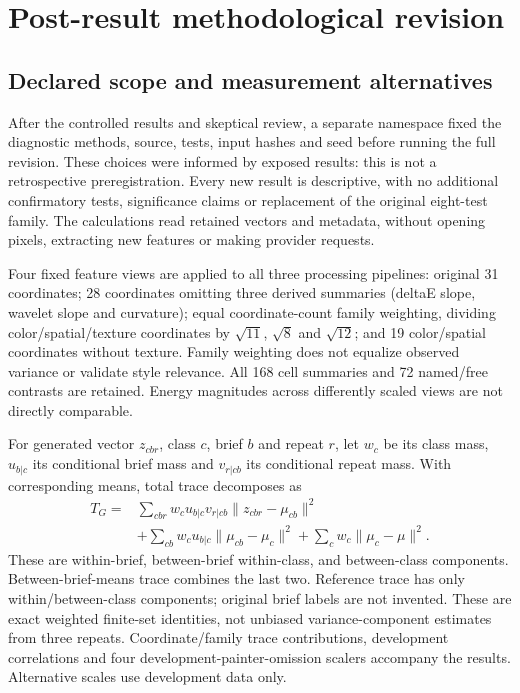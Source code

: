 \section{Post-result methodological revision}
\subsection{Declared scope and measurement alternatives}
After the controlled results and skeptical review, a separate namespace fixed
the diagnostic methods, source, tests, input hashes and seed before running the
full revision. These choices were informed by exposed results: this is not a
retrospective preregistration. Every new result is descriptive, with no additional
confirmatory tests, significance claims or replacement of the original eight-test
family. The calculations read retained vectors and metadata, without opening
pixels, extracting new features or making provider requests.

Four fixed feature views are applied to all three processing pipelines: original
31 coordinates; 28 coordinates omitting three derived summaries (deltaE slope,
wavelet slope and curvature); equal coordinate-count family weighting, dividing
color/spatial/texture coordinates by $\sqrt{11}$, $\sqrt{8}$ and $\sqrt{12}$;
and 19 color/spatial coordinates without texture. Family weighting does not
equalize observed variance or validate style relevance. All 168 cell summaries
and 72 named/free contrasts are retained. Energy magnitudes across differently
scaled views are not directly comparable.

For generated vector $z_{cbr}$, class $c$, brief $b$ and repeat $r$, let $w_c$
be its class mass, $u_{b|c}$ its conditional brief mass and $v_{r|cb}$ its
conditional repeat mass. With corresponding means, total trace decomposes as
\begin{align}
 T_G={}&\sum_{cbr}w_cu_{b|c}v_{r|cb}\|z_{cbr}-\mu_{cb}\|^2\nonumber\\
 &+\sum_{cb}w_cu_{b|c}\|\mu_{cb}-\mu_c\|^2
 +\sum_cw_c\|\mu_c-\mu\|^2.\label{eq:decomposition}
\end{align}
These are within-brief, between-brief within-class, and between-class components.
Between-brief-means trace combines the last two. Reference trace has only
within/between-class components; original brief labels are not invented. These
are exact weighted finite-set identities, not unbiased variance-component
estimates from three repeats. Coordinate/family trace contributions, development
correlations and four development-painter-omission scalers accompany the results.
Alternative scales use development data only.

